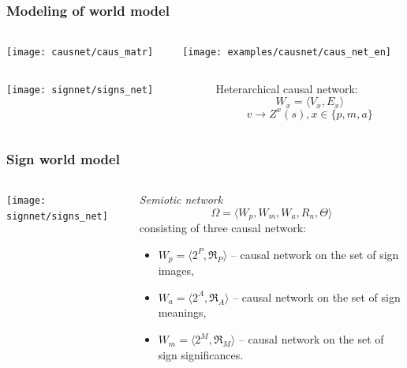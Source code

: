 \documentclass[default]{beamer}
\begin{document}
	\begin{frame}
		\frametitle{Modeling of world model}
		\begin{columns}
			\begin{column}{0.5\textwidth}
				\centering
				\texttt{[image: causnet/caus\_matr]}
				
				
			\end{column}
			\begin{column}{0.5\textwidth}
				\centering
				\texttt{[image: examples/causnet/caus\_net\_en]}
			\end{column}
		\end{columns}
		\begin{columns}
			\begin{column}{0.5\textwidth}
				\centering
				\texttt{[image: signnet/signs\_net]}
			\end{column}
			\begin{column}{0.5\textwidth}
				Heterarchical causal network:
				\[
				W_x=\langle V_x, E_x\rangle
				\]
				\[
				v\rightarrow Z^x(s), x\in \{p,m,a\}
				\]
				\vspace{-5pt}
				\nocite{*}
				\printbibliography[keyword={signmodel}, resetnumbers=true]
			\end{column}
		\end{columns}
	\end{frame}

	\begin{frame}
		\frametitle{Sign world model}
		
		\begin{columns}
			\begin{column}{0.55\textwidth}
				\texttt{[image: signnet/signs\_net]}
			\end{column}
			\begin{column}{0.45\textwidth}
				\textit{Semiotic network} \[\Omega=\langle W_p, W_m, W_a, R_n, \Theta \rangle\] consisting of three causal network: 
				\begin{itemize}
					\item $W_p=\langle2^P,\mathfrak R_P\rangle$ -- causal network on the set of sign images,
					\item $W_a=\langle2^A,\mathfrak R_A\rangle$ -- causal network on the set of sign meanings,
					\item $W_m=\langle2^M,\mathfrak R_M\rangle$ -- causal network on the set of sign significances.
				\end{itemize}
				\nocite{*}
				\printbibliography[keyword={osipov}, resetnumbers=true]
			\end{column}
		\end{columns}
	\end{frame}	
\end{document}
